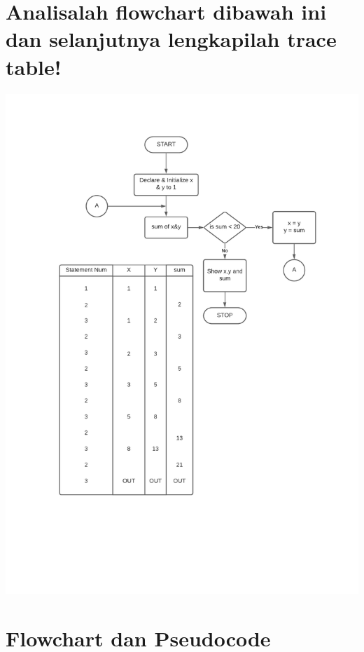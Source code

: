 \documentclass[
  12pt,
  answers  
]{exam}
\begin{document}
	\section{Analisalah flowchart dibawah ini dan selanjutnya lengkapilah trace table!} 
	\includegraphics[clip, scale=0.9,trim={2cm 1cm 0 2cm}]{pdf/ProfunKelompok-2.pdf}

	\section{Flowchart dan Pseudocode}
\end{document}
